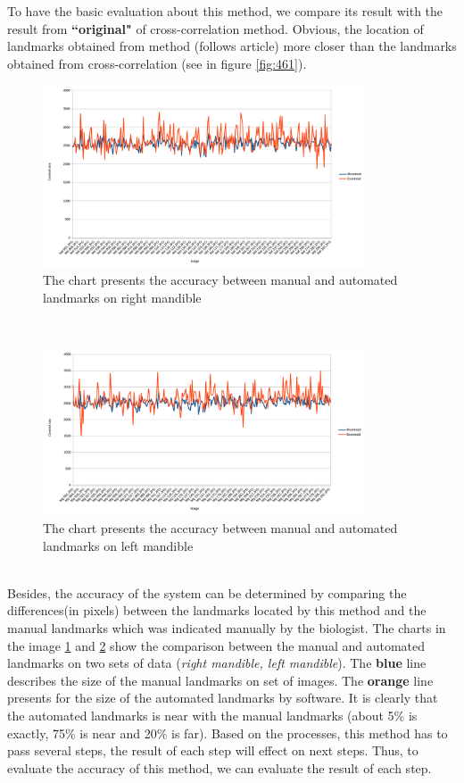 To have the basic evaluation about this method, we compare its result with the result from \textbf{``original"} of cross-correlation method. Obvious, the location of landmarks obtained from method (follows article) more closer than the landmarks obtained from cross-correlation (see in figure \ref{fig:461}).
\begin{figure}[h!]
\centering
\includegraphics[width=0.85\textwidth]{./images/MdChart}
\caption{The chart presents the accuracy between manual and automated landmarks on right mandible}
\label{fig:47}
\end{figure}~\\
\begin{figure}[h!]
\centering
\includegraphics[width=0.85\textwidth]{./images/MgChart}
\caption{The chart presents the accuracy between manual and automated landmarks on left mandible}
\label{fig:48}
\end{figure}~\\
Besides, the accuracy of the system can be determined by comparing the differences(in pixels) between the landmarks located by this method and the manual landmarks which was indicated manually by the biologist. The charts in the image \ref{fig:47} and \ref{fig:48} show the comparison between the manual and automated landmarks on two sets of data (\textit{right mandible, left mandible}). The \textbf{blue} line describes the size of the manual landmarks on set of images. The \textbf{orange} line presents for the size of the automated landmarks by software. It is clearly that the automated landmarks is near with the manual landmarks (about 5\% is exactly, 75\% is near and 20\% is far). Based on the processes, this method has to pass several steps, the result of each step will effect on next steps. Thus, to evaluate the accuracy of this method, we can evaluate the result of each step.
